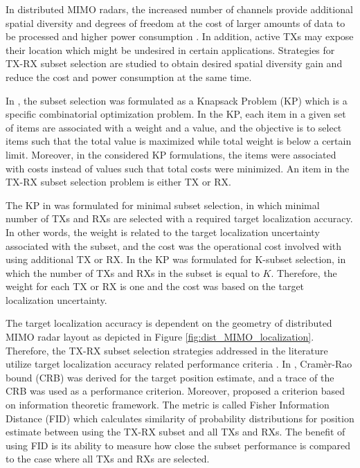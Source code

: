 \documentclass[english, 12pt, a4paper, elec, utf8, a-1b, online]{aaltothesis}
\begin{document}
In distributed MIMO radars, the increased number of channels provide additional spatial diversity and degrees of freedom at the cost of larger amounts of data to be processed and higher power consumption \cite{Haimovich2008}.
In addition, active TXs may expose their location which might be undesired in certain applications.
Strategies for TX-RX subset selection are studied to obtain desired spatial diversity gain and reduce the cost and power consumption at the same time.

In \cite{Godrich2011a, Godrich2011}, the subset selection was formulated as a Knapsack
Problem (KP) which is a specific combinatorial optimization problem.
In the KP, each item in a given set of items are associated with a weight and a value, and the objective is to select items such that the total value is maximized while total weight is below a certain limit.
Moreover, in the considered KP formulations, the items were associated with costs instead of values such that total costs were minimized.
An item in the TX-RX subset selection problem is either TX or RX.

The KP in \cite{Godrich2011a} was formulated for minimal subset selection, in which minimal number of TXs and RXs are selected with a required target localization accuracy.
In other words, the weight is related to the target localization uncertainty associated with the subset, and the cost was the operational cost involved with using additional TX or RX.
In \cite{Godrich2011} the KP was formulated for K-subset selection, in which the number of TXs and RXs in the subset is equal to $K$.
Therefore, the weight for each TX or RX is one and the cost was based on the target localization uncertainty.

The target localization accuracy is dependent on the geometry of distributed MIMO radar layout as depicted in Figure \ref{fig:dist_MIMO_localization}.
Therefore, the TX-RX subset selection strategies addressed in the literature utilize target localization accuracy related performance criteria \cite{Godrich2011a, Godrich2011a, Sun2014}. 
In \cite{Godrich2011a, Godrich2011}, Cram\`er-Rao bound (CRB) was derived for the target position estimate, and a trace of the CRB was used as a performance criterion.
Moreover, \cite{Sun2014} proposed a criterion based on information theoretic framework.
The metric is called Fisher Information Distance (FID) which calculates similarity of probability distributions for position estimate between using the TX-RX subset and all TXs and RXs.
The benefit of using FID is its ability to measure how close the subset performance is compared to the case where all TXs and RXs are selected.
\end{document}

